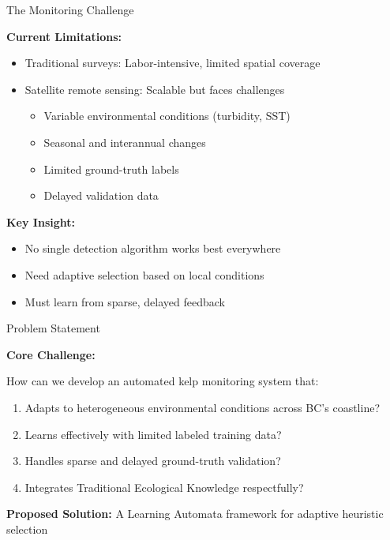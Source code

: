 \documentclass[10pt,xcolor={table,dvipsnames},t]{beamer}
\begin{document}
\begin{frame}{The Monitoring Challenge}

\textbf{Current Limitations:}
\begin{itemize}
  \item Traditional surveys: Labor-intensive, limited spatial coverage
  \item Satellite remote sensing: Scalable but faces challenges
  \begin{itemize}
    \item Variable environmental conditions (turbidity, SST)
    \item Seasonal and interannual changes
    \item Limited ground-truth labels
    \item Delayed validation data
  \end{itemize}
\end{itemize}

\vspace{0.5em}
\textbf{Key Insight:}
\begin{itemize}
  \item No single detection algorithm works best everywhere
  \item Need adaptive selection based on local conditions
  \item Must learn from sparse, delayed feedback
\end{itemize}

\end{frame}

\begin{frame}{Problem Statement}

\textbf{Core Challenge:}

How can we develop an automated kelp monitoring system that:

\begin{enumerate}
  \item Adapts to heterogeneous environmental conditions across BC's coastline?

  \item Learns effectively with limited labeled training data?

  \item Handles sparse and delayed ground-truth validation?

  \item Integrates Traditional Ecological Knowledge respectfully?
\end{enumerate}

\vspace{0.5em}
\textbf{Proposed Solution:} A Learning Automata framework for adaptive heuristic selection

\end{frame}
\end{document}
